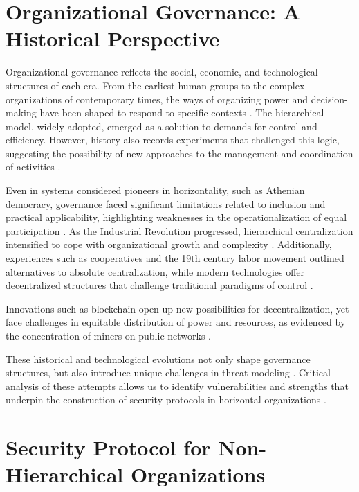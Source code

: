 \section{Organizational Governance: A Historical Perspective}
\label{sec:organizational_governance_historical}

Organizational governance reflects the social, economic, and technological
structures of each era. From the earliest human groups to the complex
organizations of contemporary times, the ways of organizing power and
decision-making have been shaped to respond to specific contexts
\cite{Non-HierarchicalForms}. The hierarchical model, widely adopted, emerged as
a solution to demands for control and efficiency. However, history also records
experiments that challenged this logic, suggesting the possibility of new
approaches to the management and coordination of activities
\cite{WorkerCooperativesinAmerica, WorkerCooperativesandRevolution}.

Even in systems considered pioneers in horizontality, such as Athenian
democracy, governance faced significant limitations related to inclusion and
practical applicability, highlighting weaknesses in the operationalization of
equal participation \cite{AthenianDemocracyABrief}. As the Industrial Revolution
progressed, hierarchical centralization intensified to cope with organizational
growth and complexity \cite{WorkerCooperativesandRevolution}. Additionally,
experiences such as cooperatives and the 19th century labor movement outlined
alternatives to absolute centralization, while modern technologies offer
decentralized structures that challenge traditional paradigms of control
\cite{WorkerCooperativesinAmerica, EverydayRevolutions}.

Innovations such as blockchain open up new possibilities for decentralization,
yet face challenges in equitable distribution of power and resources, as
evidenced by the concentration of miners on public networks
\cite{Energytheftdetectionissues}.

These historical and technological evolutions not only shape governance
structures, but also introduce unique challenges in threat modeling
\cite{DoArtifactsHavePolitics, Democraciaeoscodigosinvisiveis}. Critical analysis of
these attempts allows us to identify vulnerabilities and strengths that underpin
the construction of security protocols in horizontal organizations
\cite{Colbac}.

\section{Security Protocol for Non-Hierarchical Organizations}
\label{sec:security_protocol_nonhierarchical}

